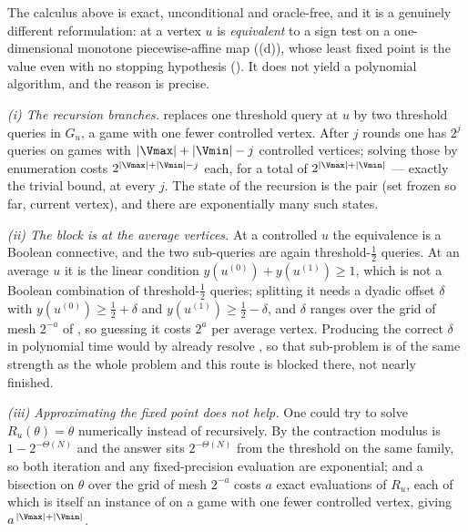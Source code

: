 \begin{remark}\label{rem:bv-verdict}
The calculus above is exact, unconditional and oracle-free, and it is a
genuinely different reformulation:  at a vertex $u$ is
\emph{equivalent} to a sign test on a one-dimensional monotone
piecewise-affine map ((d)), whose least fixed point
is the value even with no stopping hypothesis (). It
does not yield a polynomial algorithm, and the reason is precise.

\emph{(i) The recursion branches.}  replaces one
threshold query at $u$ by two threshold queries in $G_u$, a game with one
fewer controlled vertex. After $j$ rounds one has $2^{j}$ queries on
games with $|\Vmax|+|\Vmin|-j$ controlled vertices; solving those by
enumeration costs $2^{|\Vmax|+|\Vmin|-j}$ each, for a total of
$2^{|\Vmax|+|\Vmin|}$ --- exactly the trivial bound, at every $j$. The
state of the recursion is the pair (set frozen so far, current vertex),
and there are exponentially many such states.

\emph{(ii) The block is at the average vertices.} At a controlled $u$ the
equivalence is a Boolean connective, and the two sub-queries are again
threshold-$\tfrac12$ queries. At an average $u$ it is the linear
condition $y(u^{(0)})+y(u^{(1)})\ge1$, which is not a Boolean combination
of threshold-$\tfrac12$ queries; splitting it needs a dyadic offset
$\delta$ with $y(u^{(0)})\ge\tfrac12+\delta$ and
$y(u^{(1)})\ge\tfrac12-\delta$, and $\delta$ ranges over the grid of mesh
$2^{-a}$ of , so guessing it costs $2^{a}$ per
average vertex. Producing the correct $\delta$ in polynomial time would
by  already resolve , so that
sub-problem is of the same strength as the whole problem and this route
is blocked there, not nearly finished.

\emph{(iii) Approximating the fixed point does not help.} One could try
to solve $R_u(\theta)=\theta$ numerically instead of recursively. By
 the contraction modulus is $1-2^{-\Theta(N)}$ and the
answer sits $2^{-\Theta(N)}$ from the threshold on the same family, so
both iteration and any fixed-precision evaluation are exponential; and a
bisection on $\theta$ over the grid of mesh $2^{-a}$ costs $a$ exact
evaluations of $R_u$, each of which is itself an instance of
 on a game with one fewer controlled vertex, giving
$a^{\,|\Vmax|+|\Vmin|}$.


\end{remark}
